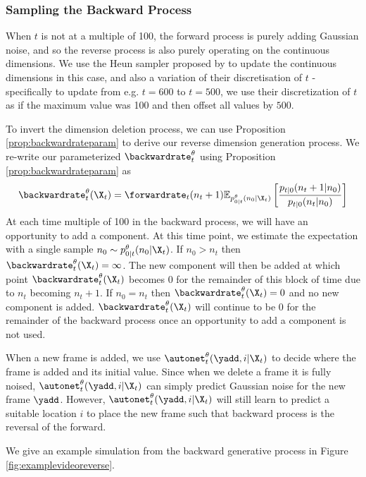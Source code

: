 \subsubsection{Sampling the Backward Process}

When $t$ is not at a multiple of 100, the forward process is purely adding Gaussian noise, and so the reverse process is also purely operating on the continuous dimensions. We use the Heun sampler proposed by \cite{karraselucidating2022} to update the continuous dimensions in this case, and also a variation of their discretisation of $t$ - specifically to update from e.g. $t=600$ to $t=500$, we use their discretization of $t$ as if the maximum value was 100 and then offset all values by $500$. 

To invert the dimension deletion process, we can use Proposition \ref{prop:backwardrateparam} to derive our reverse dimension generation process. We re-write our parameterized $\backwardrate_t^\theta$ using Proposition \ref{prop:backwardrateparam} as 
\begin{equation}
    \backwardrate_t^\theta(\X_t) = \forwardrate_t(n_t + 1) \mathbb{E}_{p_{0|t}^\theta(n_0 | \X_t)} \left[ \frac{p_{t|0}(n_t + 1 | n_0)}{p_{t|0}(n_t | n_0)}\right]
\end{equation}
At each time multiple of 100 in the backward process, we will have an opportunity to add a component. At this time point, we estimate the expectation with a single sample $n_0 \sim p_{0|t}^\theta(n_0 | \X_t)$. If $n_0 > n_t$ then $\backwardrate_t^\theta(\X_t) = \infty$. The new component will then be added at which point $\backwardrate_t^\theta(\X_t)$ becomes $0$ for the remainder of this block of time due to $n_t$ becoming $n_t+1$. If $n_0 = n_t$ then $\backwardrate_t^\theta(\X_t) = 0$ and no new component is added. $\backwardrate_t^\theta(\X_t)$ will continue to be $0$ for the remainder of the backward process once an opportunity to add a component is not used.

When a new frame is added, we use $\autonet_t^\theta(\yadd, i | \X_t)$ to decide where the frame is added and its initial value. Since when we delete a frame it is fully noised, $\autonet_t^\theta(\yadd, i | \X_t)$ can simply predict Gaussian noise for the new frame $\yadd$. However, $\autonet_t^\theta(\yadd, i | \X_t)$ will still learn to predict a suitable location $i$ to place the new frame such that backward process is the reversal of the forward.

We give an example simulation from the backward generative process in Figure \ref{fig:examplevideoreverse}.

